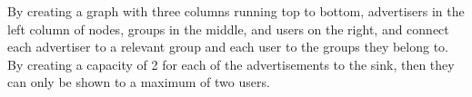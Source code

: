 \documentclass[12pt]{article}
\begin{document}
By creating a graph with three columns running top to bottom, advertisers 
in the left column of nodes, groups in the middle, and users on the right,
and connect each advertiser to a relevant group and each user to the groups
they belong to. By creating a capacity of 2 for each of the advertisements
to the sink, then they can only be shown to a maximum of two users.
\end{document}
